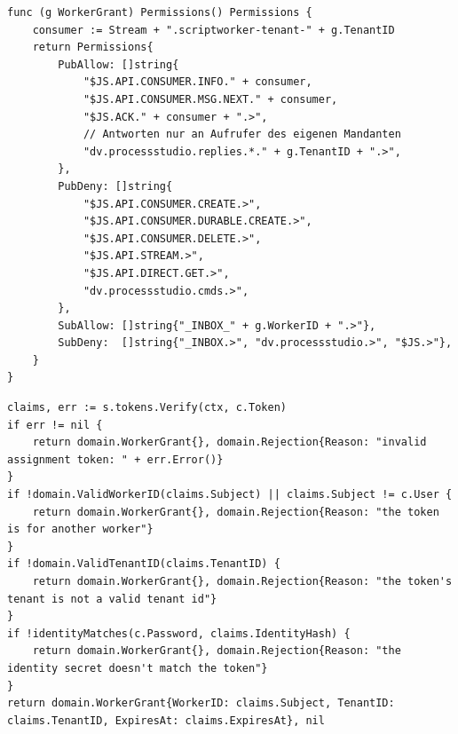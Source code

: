 
\begin{lstlisting}[language=GoLang, caption={[Rechte der NATS-Verbindung eines Workers (Auth Callout, \texttt{WorkerGrant.Permissions}, Go)]Rechte der NATS-Verbindung eines Workers (Auth Callout, \texttt{WorkerGrant.Permissions}, Go). Das Inbox-Präfix \texttt{\_INBOX\_<Worker>} setzt der Client des Transports}, label={lst:callout-rechte}]
func (g WorkerGrant) Permissions() Permissions {
	consumer := Stream + ".scriptworker-tenant-" + g.TenantID
	return Permissions{
		PubAllow: []string{
			"$JS.API.CONSUMER.INFO." + consumer,
			"$JS.API.CONSUMER.MSG.NEXT." + consumer,
			"$JS.ACK." + consumer + ".>",
			// Antworten nur an Aufrufer des eigenen Mandanten
			"dv.processstudio.replies.*." + g.TenantID + ".>",
		},
		PubDeny: []string{
			"$JS.API.CONSUMER.CREATE.>",
			"$JS.API.CONSUMER.DURABLE.CREATE.>",
			"$JS.API.CONSUMER.DELETE.>",
			"$JS.API.STREAM.>",
			"$JS.API.DIRECT.GET.>",
			"dv.processstudio.cmds.>",
		},
		SubAllow: []string{"_INBOX_" + g.WorkerID + ".>"},
		SubDeny:  []string{"_INBOX.>", "dv.processstudio.>", "$JS.>"},
	}
}
\end{lstlisting}

\begin{lstlisting}[language=GoLang, caption={Prüfung der Verbindung eines Workers im Auth Callout (\texttt{Service.Authorize}, Go)}, label={lst:callout-token}]
claims, err := s.tokens.Verify(ctx, c.Token)
if err != nil {
	return domain.WorkerGrant{}, domain.Rejection{Reason: "invalid assignment token: " + err.Error()}
}
if !domain.ValidWorkerID(claims.Subject) || claims.Subject != c.User {
	return domain.WorkerGrant{}, domain.Rejection{Reason: "the token is for another worker"}
}
if !domain.ValidTenantID(claims.TenantID) {
	return domain.WorkerGrant{}, domain.Rejection{Reason: "the token's tenant is not a valid tenant id"}
}
if !identityMatches(c.Password, claims.IdentityHash) {
	return domain.WorkerGrant{}, domain.Rejection{Reason: "the identity secret doesn't match the token"}
}
return domain.WorkerGrant{WorkerID: claims.Subject, TenantID: claims.TenantID, ExpiresAt: claims.ExpiresAt}, nil
\end{lstlisting}

